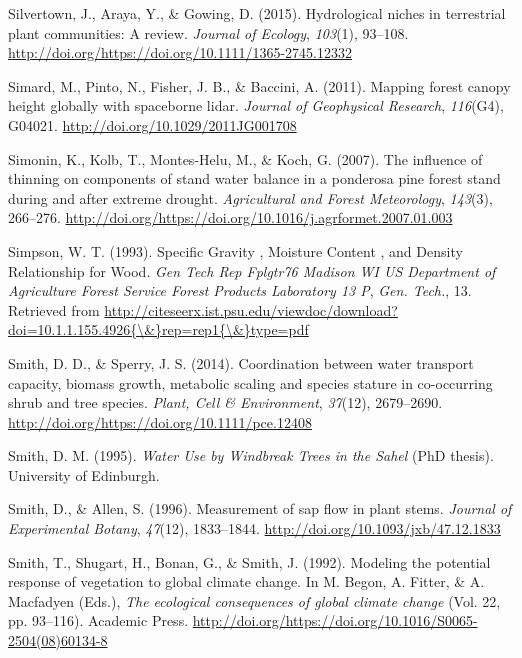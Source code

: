 \documentclass[11pt,twoside]{reedthesis}
\begin{document}
\hypertarget{ref-Silvertown2015}{}
Silvertown, J., Araya, Y., \& Gowing, D. (2015). Hydrological niches in
terrestrial plant communities: A review. \emph{Journal of Ecology},
\emph{103}(1), 93--108.
\url{http://doi.org/https://doi.org/10.1111/1365-2745.12332}

\hypertarget{ref-simard_mapping_2011}{}
Simard, M., Pinto, N., Fisher, J. B., \& Baccini, A. (2011). Mapping
forest canopy height globally with spaceborne lidar. \emph{Journal of
Geophysical Research}, \emph{116}(G4), G04021.
\url{http://doi.org/10.1029/2011JG001708}

\hypertarget{ref-simonin2007}{}
Simonin, K., Kolb, T., Montes-Helu, M., \& Koch, G. (2007). The
influence of thinning on components of stand water balance in a
ponderosa pine forest stand during and after extreme drought.
\emph{Agricultural and Forest Meteorology}, \emph{143}(3), 266--276.
\url{http://doi.org/https://doi.org/10.1016/j.agrformet.2007.01.003}

\hypertarget{ref-Simpson1993}{}
Simpson, W. T. (1993). Specific Gravity , Moisture Content , and Density
Relationship for Wood. \emph{Gen Tech Rep Fplgtr76 Madison WI US
Department of Agriculture Forest Service Forest Products Laboratory 13
P}, \emph{Gen. Tech.}, 13. Retrieved from
\href{http://citeseerx.ist.psu.edu/viewdoc/download?doi=10.1.1.155.4926\%7B/\&\%7Drep=rep1\%7B/\&\%7Dtype=pdf}{http://citeseerx.ist.psu.edu/viewdoc/download?doi=10.1.1.155.4926\{\textbackslash{}\&\}rep=rep1\{\textbackslash{}\&\}type=pdf}

\hypertarget{ref-Smith2014}{}
Smith, D. D., \& Sperry, J. S. (2014). Coordination between water
transport capacity, biomass growth, metabolic scaling and species
stature in co-occurring shrub and tree species. \emph{Plant, Cell \&
Environment}, \emph{37}(12), 2679--2690.
\url{http://doi.org/https://doi.org/10.1111/pce.12408}

\hypertarget{ref-Smith1995}{}
Smith, D. M. (1995). \emph{Water Use by Windbreak Trees in the Sahel}
(PhD thesis). University of Edinburgh.

\hypertarget{ref-Smith1996}{}
Smith, D., \& Allen, S. (1996). Measurement of sap flow in plant stems.
\emph{Journal of Experimental Botany}, \emph{47}(12), 1833--1844.
\url{http://doi.org/10.1093/jxb/47.12.1833}

\hypertarget{ref-Smith1992}{}
Smith, T., Shugart, H., Bonan, G., \& Smith, J. (1992). Modeling the
potential response of vegetation to global climate change. In M. Begon,
A. Fitter, \& A. Macfadyen (Eds.), \emph{The ecological consequences of
global climate change} (Vol. 22, pp. 93--116). Academic Press.
\url{http://doi.org/https://doi.org/10.1016/S0065-2504(08)60134-8}
\end{document}

